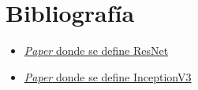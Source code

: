 \section{Bibliografía}
\setcounter{page}{17}
\begin{itemize}
\item \href{https://arxiv.org/pdf/1512.03385.pdf}{\textit{Paper} donde se define ResNet}
\item \href{https://arxiv.org/pdf/1409.4842.pdf}{\textit{Paper} donde se define InceptionV3}
\end{itemize}